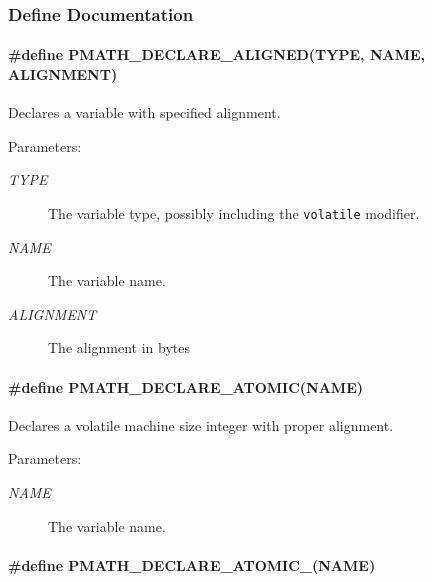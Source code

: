 \subsubsection{Define Documentation}
\hypertarget{group__atomic__ops_g7c8d6965c55b4461f4c93dbcd0e54e44}{
\paragraph[{PMATH\_\-DECLARE\_\-ALIGNED}]{\setlength{\rightskip}{0pt plus 5cm}\#define PMATH\_\-DECLARE\_\-ALIGNED(TYPE, \/  NAME, \/  ALIGNMENT)}\hfill}
\label{group__atomic__ops_g7c8d6965c55b4461f4c93dbcd0e54e44}


Declares a variable with specified alignment. 

\begin{Desc}
\item[Parameters:]
\begin{description}
\item[{\em TYPE}]The variable type, possibly including the {\tt volatile} modifier. \item[{\em NAME}]The variable name. \item[{\em ALIGNMENT}]The alignment in bytes \end{description}
\end{Desc}
\hypertarget{group__atomic__ops_gea9d23f3c2f74768863e67ff2a8d17df}{
\paragraph[{PMATH\_\-DECLARE\_\-ATOMIC}]{\setlength{\rightskip}{0pt plus 5cm}\#define PMATH\_\-DECLARE\_\-ATOMIC(NAME)}\hfill}
\label{group__atomic__ops_gea9d23f3c2f74768863e67ff2a8d17df}


Declares a volatile machine size integer with proper alignment. 

\begin{Desc}
\item[Parameters:]
\begin{description}
\item[{\em NAME}]The variable name. \end{description}
\end{Desc}
\hypertarget{group__atomic__ops_g2228cd9578858b0f60078fc87ef0774a}{
\paragraph[{PMATH\_\-DECLARE\_\-ATOMIC\_\-2}]{\setlength{\rightskip}{0pt plus 5cm}\#define PMATH\_\-DECLARE\_\-ATOMIC\_(NAME)}\hfill}
\label{group__atomic__ops_g2228cd9578858b0f60078fc87ef0774a}


